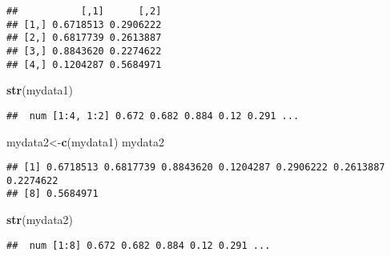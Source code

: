 \documentclass[]{book}
\newenvironment{Shaded}{\begin{snugshade}}{\end{snugshade}}
\newcommand{\KeywordTok}[1]{\textcolor[rgb]{0.13,0.29,0.53}{\textbf{#1}}}
\newcommand{\NormalTok}[1]{#1}
\begin{document}
\begin{verbatim}
##           [,1]      [,2]
## [1,] 0.6718513 0.2906222
## [2,] 0.6817739 0.2613887
## [3,] 0.8843620 0.2274622
## [4,] 0.1204287 0.5684971
\end{verbatim}

\begin{Shaded}
\begin{Highlighting}[]
\KeywordTok{str}\NormalTok{(mydata1)}
\end{Highlighting}
\end{Shaded}

\begin{verbatim}
##  num [1:4, 1:2] 0.672 0.682 0.884 0.12 0.291 ...
\end{verbatim}

\begin{Shaded}
\begin{Highlighting}[]
\NormalTok{mydata2<-}\KeywordTok{c}\NormalTok{(mydata1)}
\NormalTok{mydata2}
\end{Highlighting}
\end{Shaded}

\begin{verbatim}
## [1] 0.6718513 0.6817739 0.8843620 0.1204287 0.2906222 0.2613887 0.2274622
## [8] 0.5684971
\end{verbatim}

\begin{Shaded}
\begin{Highlighting}[]
\KeywordTok{str}\NormalTok{(mydata2)}
\end{Highlighting}
\end{Shaded}

\begin{verbatim}
##  num [1:8] 0.672 0.682 0.884 0.12 0.291 ...
\end{verbatim}


\end{document}
